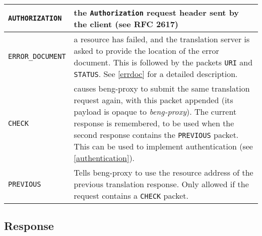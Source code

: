 \documentclass[a4paper,12pt]{article}
\begin{document}
\begin{longtable}{|l|p{10cm}|}
\verb|AUTHORIZATION| & the \texttt{Authorization} request header
sent by the client (see RFC 2617) \\

\hline

\verb|ERROR_DOCUMENT| & a resource has failed, and the translation
server is asked to provide the location of the error document.  This
is followed by the packets \verb|URI| and \verb|STATUS|.  See
\ref{errdoc} for a detailed description. \\

\hline

\verb|CHECK| & causes beng-proxy to submit the same translation
request again, with this packet appended (its payload is opaque to
\emph{beng-proxy}).  The current response is remembered, to be used
when the second response contains the \verb|PREVIOUS| packet.  This
can be used to implement authentication (see \ref{authentication}). \\

\hline

\verb|PREVIOUS| & Tells beng-proxy to use the resource address of
the previous translation response.  Only allowed if the request
contains a \verb|CHECK| packet. \\

\hline

\end{longtable}

\subsection{Response}
\end{document}
